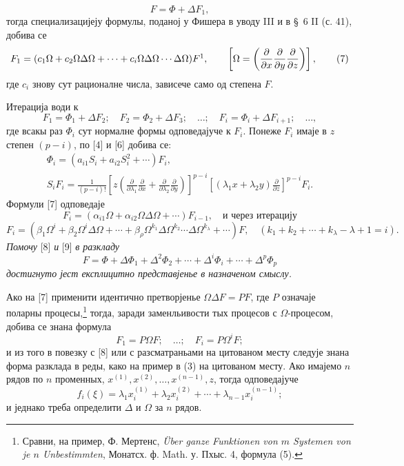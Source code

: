 ﻿\documentclass[11pt]{article}
\providecommand{\p}{\partial}
\begin{document}
\begin{equation}
        F=\Phi+\Delta F_1,
\tag{2a}
\end{equation}
тогда специализацијеју формулы, поданој у Фишера в уводу III и в \S~6 II (с. 41), добива се
\begin{equation}
        F_1=(c_1\Omega+c_2\Omega\Delta\Omega+\cdots+c_i\Omega\Delta\Omega\cdots\Delta\Omega)F\footnotemark,
        \qquad \left[\Omega=\left(\frac{\p}{\p x}\frac{\p}{\p y}\frac{\p}{\p z}\right)\right],
\tag{7}
\end{equation}
где \(c_i\) знову сут рационалне числа, зависече само од степена \(F\).

Итерација води к
\[
        F_1=\Phi_1+\Delta F_2;\quad F_2=\Phi_2+\Delta F_3;\quad\ldots;\quad
        F_i=\Phi_i+\Delta F_{i+1};\quad\ldots,
\]
где всакы раз \(\Phi_i\) сут нормалне формы одповедајуче к \(F_i\). Понеже \(F_i\) имаје в \(z\) степен \((p-i)\), по [4] и [6] добива се:
\begin{equation}
\begin{gathered}
        \Phi_i=(a_{i1}S_i+a_{i2}S_i^2+\cdots)F_i,\\
        S_iF_i=\frac1{(p-i)!}
        \left[z\left(\frac{\p}{\p\lambda_1}\frac{\p}{\p x}+
        \frac{\p}{\p\lambda_2}\frac{\p}{\p y}\right)\right]^{p-i}
        \left[(\lambda_1x+\lambda_2y)\frac{\p}{\p z}\right]^{p-i}F_i.
\end{gathered}
\tag{8}
\end{equation}
Формули [7] одповедаје
\[
        F_i=(\alpha_{i1}\Omega+\alpha_{i2}\Omega\Delta\Omega+\cdots)F_{i-1},
        \quad\text{и через итерацију}
\]
\begin{equation}
        F_i=(\beta_1\Omega^i+\beta_2\Omega^i\Delta\Omega+\cdots
        +\beta_\rho\Omega^{k_1}\Delta\Omega^{k_2}\cdots\Delta\Omega^{k_\lambda}+\cdots)F,
        \quad(k_1+k_2+\cdots+k_\lambda-\lambda+1=i).
\tag{9}
\end{equation}
{\itshape Помочу} [8] {\itshape и} [9] {\itshape в разкладу}
\[
        F=\Phi+\Delta\Phi_1+\Delta^2\Phi_2+\cdots+\Delta^i\Phi_i+\cdots+\Delta^p\Phi_p
\]
{\itshape достигнуто јест експлицитно представјенье в назначеном смыслу.}

Ако на [7] применити идентично претворјенье \(\Omega\Delta F=PF\), где \(P\) означаје поларны процесы,\footnote{Сравни, на пример, Ф. Мертенс, \emph{Über ganze Funktionen von \(m\) Systemen von je \(n\) Unbestimmten}, Монатсх. ф. Math. у. Пхыс. 4, формула (5).} тогда, заради заменльивости тых процесов с \(\Omega\)-процесом, добива се знана формула
\[
        F_1=P\Omega F;\quad\ldots;\quad F_i=P\Omega^iF;
\]
и из того в повезку с [8] или с разсматраньами на цитованом месту следује знана форма разклада в реды, како на пример в (3) на цитованом месту. Ако имајемо \(n\) рядов по \(n\) променных, \(x^{(1)},x^{(2)},\ldots,x^{(n-1)},z\), тогда одповедајуче
\[
        f_i(\xi)=\lambda_1x_i^{(1)}+\lambda_2x_i^{(2)}+\cdots+\lambda_{n-1}x_i^{(n-1)};
\]
и једнако треба определити \(\Delta\) и \(\Omega\) за \(n\) рядов.
\end{document}
